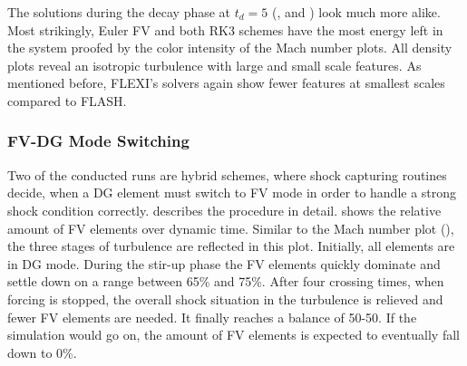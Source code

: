 The solutions during the decay phase at $t_d = 5$
(,
 and
)
look much more alike. Most strikingly, Euler FV and both RK3 schemes have the
most energy left in the system proofed by the color intensity of the Mach
number plots. All density plots reveal an isotropic turbulence with large and
small scale features. As mentioned before, FLEXI's solvers again show fewer
features at smallest scales compared to FLASH.







\subsubsection{FV-DG Mode Switching}
\label{sec:stirturb-mode-switching}
Two of the conducted runs are hybrid schemes, where shock capturing routines
decide, when a DG element must switch to FV mode in order to handle a strong
shock condition correctly.  describes the procedure in
detail.  shows the relative
amount of FV elements over dynamic time. Similar to the Mach number plot
(), the three stages of turbulence
are reflected in this plot. Initially, all elements are in DG mode.  During the
stir-up phase the FV elements quickly dominate and settle down on a range
between 65\% and 75\%. After four crossing times, when forcing is
stopped, the overall shock situation in the turbulence is relieved and fewer FV
elements are needed. It finally reaches a balance of 50-50.  If the simulation
would go on, the amount of FV elements is expected to eventually fall down to 0\%.

